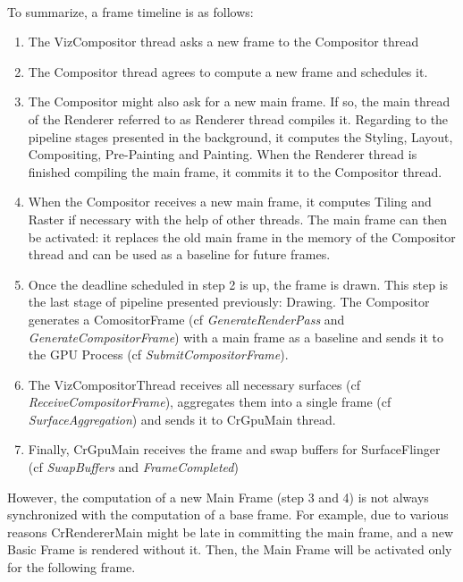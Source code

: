 


\paragraph{}
To summarize, a frame timeline is as follows:
\begin{enumerate}
    \item The VizCompositor thread asks a new frame to the Compositor thread
    \item The Compositor thread  agrees to compute a new frame and schedules it.
    \item The Compositor might also ask for a new main frame. If so, the main thread of the Renderer referred to as Renderer thread compiles it. Regarding to the pipeline stages presented in the background, it computes the Styling, Layout, Compositing, Pre-Painting and Painting. When the Renderer thread is finished compiling the main frame, it commits it to the Compositor thread.
    \item When the Compositor receives a new main frame, it computes Tiling and Raster if necessary with the help of other threads. The main frame can then be activated: it replaces the old main frame in the memory of the Compositor thread and can be used as a baseline for future frames.
    \item Once the deadline scheduled in step 2 is up, the frame is drawn. This step is the last stage of pipeline presented previously: Drawing. The Compositor generates a ComositorFrame (cf \textit{GenerateRenderPass} and \textit{GenerateCompositorFrame}) with a main frame as a baseline and sends it to the GPU Process (cf \textit{SubmitCompositorFrame}).
    \item The VizCompositorThread receives all necessary surfaces (cf \textit{ReceiveCompositorFrame}), aggregates them into a single frame (cf \textit{SurfaceAggregation}) and sends it to CrGpuMain thread.
    \item Finally, CrGpuMain receives the frame and swap buffers for SurfaceFlinger (cf \textit{SwapBuffers} and \textit{FrameCompleted})
\end{enumerate}

However, the computation of a new Main Frame (step 3 and 4) is not always synchronized with the computation of a base frame. For example, due to various reasons  CrRendererMain might be late in committing the main frame, and a new Basic Frame is rendered without it. Then, the Main Frame will be activated only for the following frame.

